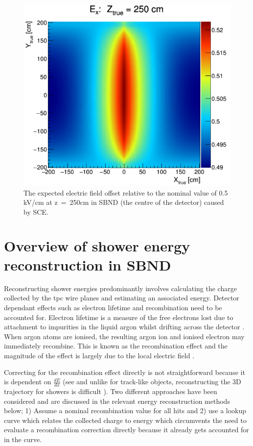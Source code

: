 \begin{figure}[h]
    \centering
    \includegraphics[width = \largefigwidth]{figures-chap4/SCE_map_SBND.png}
    \caption{The expected electric field offset relative to the nominal value of 0.5 kV/cm at z~=~250cm in SBND (the centre of the detector) caused by SCE.}
    \label{fig:SCE_map}
\end{figure}


\section{Overview of shower energy reconstruction in SBND}\label{subchap:shower reco overview}
Reconstructing shower energies predominantly involves calculating the charge collected by the \Gls{tpc} wire planes and estimating an associated energy. Detector dependant effects such as electron lifetime and recombination need to be accounted for. Electron lifetime is a measure of the free electrons lost due to attachment to impurities in the liquid argon whilst drifting across the detector \cite{ArgoNeuT_electron_lifetime_paper}. When argon atoms are ionised, the resulting argon ion and ionised electron may immediately recombine. This is known as the recombination effect and the magnitude of the effect is largely due to the local electric field \cite{ArgoNeuT_recombination_paper}. 

Correcting for the recombination effect directly is not straightforward because it is dependent on $\frac{dE}{dx}$ (see  and unlike for track-like objects, reconstructing the 3D trajectory for showers is difficult \cite{MicroBooNE_photon_Ereco_paper}). Two different approaches have been considered and are discussed in the relevant energy reconstruction methods below; 1) Assume a nominal recombination value for all hits and 2) use a lookup curve which relates the collected charge to energy which circumvents the need to evaluate a recombination correction directly because it already gets accounted for in the curve.


